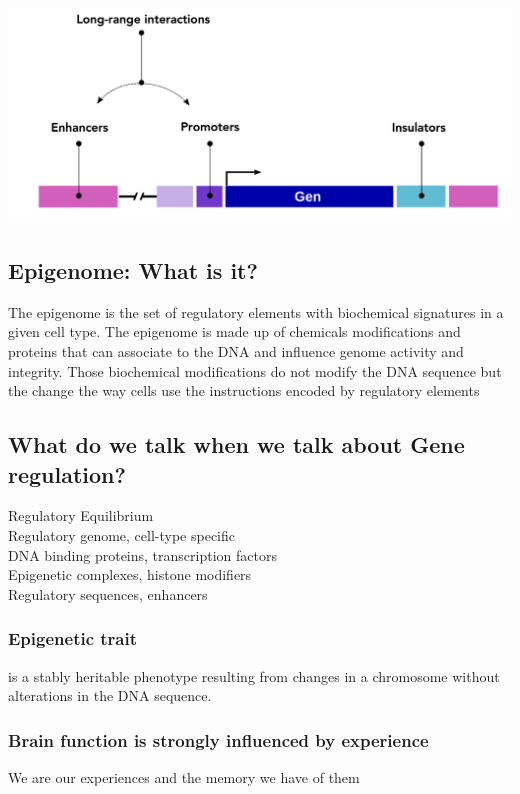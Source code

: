 \begin{itemize}
\begin{itemize}
\includegraphics[width=1\textwidth]{Images/Epigenetics1.png}\\[1cm]

\subsection{Epigenome: What is it?}
The epigenome is the set of regulatory elements with biochemical signatures in a given cell type. The epigenome is made up of chemicals modifications and proteins that can associate  to the DNA and influence genome activity and integrity. Those biochemical modifications do not modify the DNA sequence but the change the way cells use the instructions encoded by regulatory elements

\subsection{What do we talk when we talk about Gene regulation?}
Regulatory Equilibrium
\\Regulatory genome, cell-type specific
\\DNA binding proteins, transcription factors
\\Epigenetic complexes, histone modifiers
\\Regulatory sequences, enhancers

\subsubsection{Epigenetic trait}
is a stably heritable phenotype resulting from changes in a chromosome without alterations in the DNA sequence.

\subsubsection{Brain function is strongly influenced by experience}
We are our experiences and the memory we have of them



\end{itemize}
\end{itemize}
